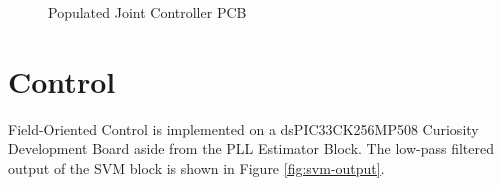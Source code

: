 \documentclass[english]{upeeei}
\begin{document}
\begin{figure}[H]
\begin{centering}
\par\end{centering}
\begin{centering}
\par\end{centering}
\caption{Populated Joint Controller PCB\label{fig:joint-controller-pcb-full}}
\end{figure}

\section{Control}

Field-Oriented Control is implemented on a dsPIC33CK256MP508 Curiosity Development Board aside from the PLL Estimator Block. The low-pass filtered output of the SVM block is shown in Figure \ref{fig:svm-output}.
\end{document}
